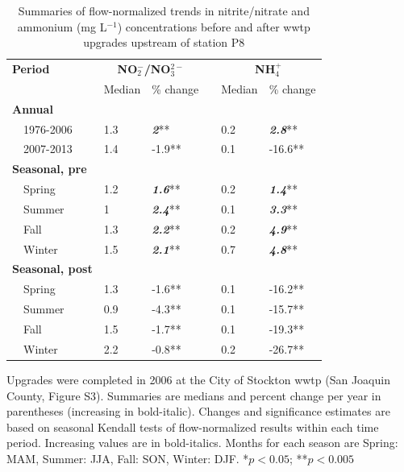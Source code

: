 \documentclass[letterpaper,12pt,oneside]{article}\usepackage[]{graphicx}\usepackage[]{color}
\begin{document}
\begin{table}[!tbp]
\caption{Summaries of flow-normalized trends in nitrite/nitrate and ammonium (mg L$^{-1}$) concentrations before and after \ac{wwtp} upgrades upstream of station P8\label{tab:p8chg}} 
\begin{center}
\begin{tabular}{lllcll}
\hline\hline
\multicolumn{1}{l}{\bfseries Period}&\multicolumn{2}{c}{\bfseries NO$_{2}^{-}$/NO$_{3}^{2-}$}&\multicolumn{1}{c}{\bfseries }&\multicolumn{2}{c}{\bfseries NH$_{4}^{+}$}\tabularnewline
\cline{2-3} \cline{5-6}
\multicolumn{1}{l}{}&\multicolumn{1}{c}{Median}&\multicolumn{1}{c}{\% change}&\multicolumn{1}{c}{}&\multicolumn{1}{c}{Median}&\multicolumn{1}{c}{\% change}\tabularnewline
\hline
{\bfseries Annual}&&&&&\tabularnewline
~~1976-2006&1.3&\textit{\textbf{2}}**&&0.2&\textit{\textbf{2.8}}**\tabularnewline
~~2007-2013&1.4&-1.9**&&0.1&-16.6**\tabularnewline
\hline
{\bfseries Seasonal, pre}&&&&&\tabularnewline
~~Spring&1.2&\textit{\textbf{1.6}}**&&0.2&\textit{\textbf{1.4}}**\tabularnewline
~~Summer&1&\textit{\textbf{2.4}}**&&0.1&\textit{\textbf{3.3}}**\tabularnewline
~~Fall&1.3&\textit{\textbf{2.2}}**&&0.2&\textit{\textbf{4.9}}**\tabularnewline
~~Winter&1.5&\textit{\textbf{2.1}}**&&0.7&\textit{\textbf{4.8}}**\tabularnewline
\hline
{\bfseries Seasonal, post}&&&&&\tabularnewline
~~Spring&1.3&-1.6**&&0.1&-16.2**\tabularnewline
~~Summer&0.9&-4.3**&&0.1&-15.7**\tabularnewline
~~Fall&1.5&-1.7**&&0.1&-19.3**\tabularnewline
~~Winter&2.2&-0.8**&&0.2&-26.7**\tabularnewline
\hline
\end{tabular}\end{center}
\footnotesize Upgrades were completed in 2006 at the City of Stockton \ac{wwtp} (San Joaquin County, Figure S3). Summaries are  medians and percent change per year in parentheses (increasing in bold-italic).  Changes and significance estimates are based on seasonal Kendall tests of flow-normalized results within each time period. Increasing values are in bold-italics. Months for each season are Spring: MAM, Summer: JJA, Fall: SON, Winter: DJF. *$p<0.05$; **$p<0.005$\end{table}


\clearpage
\end{document}
